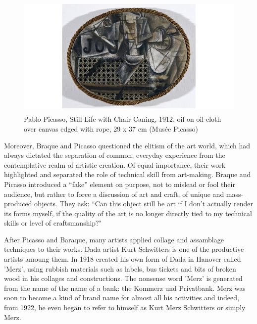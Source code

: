 

\begin{figure}[h!]
  \centering
  \includegraphics[height=6cm]{graphics/picasso_chair.png}
  \caption{Pablo Picasso, Still Life with Chair Caning, 1912, oil on oil-cloth over canvas edged with rope, 29 x 37 cm (Musée Picasso)}
  \label{fig:Picasso_Chair}
\end{figure}

Moreover, Braque and Picasso questioned the elitism of the art world, which had always dictated the separation of common, everyday experience from the  contemplative realm of artistic creation. Of equal importance, their work highlighted and separated the role of technical skill from art-making. Braque and Picasso introduced a “fake” element on purpose, not to mislead or fool their audience, but rather to force a discussion of art and craft, of unique and mass-produced objects. They ask: “Can this object still be art if I don’t actually render its forms myself, if the quality of the art is no longer directly tied to my technical skills or level of craftsmanship?"

After Picasso and Baraque, many artists applied collage and assamblage techniques to their works. Dada artist Kurt Schwitters is one of the productive artists amoung them. In 1918 created his own form of Dada in Hanover called 'Merz', using rubbish materials such as labels, bus tickets and bits of broken wood in his collages and constructions. The nonsense word 'Merz' is generated from the name of the name of a bank: the Kommerz und Privatbank. Merz was soon to become a kind of brand name for almost all his activities and indeed, from 1922, he even began to refer to himself as Kurt Merz Schwitters or simply Merz.

